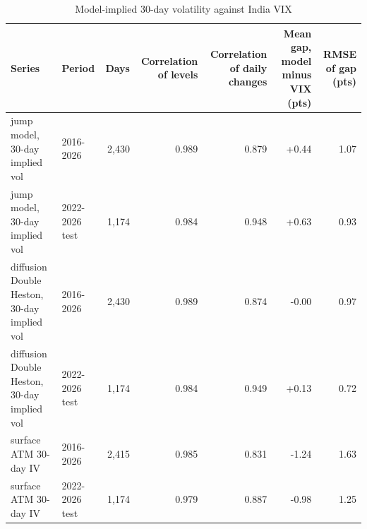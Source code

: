 \begin{table}[ht]
\centering
\small
\caption{Model-implied 30-day volatility against India VIX}
\begin{tabular}{llrrrrr}
\toprule
Series & Period & Days & Correlation of levels & Correlation of daily changes & Mean gap, model minus VIX (pts) & RMSE of gap (pts) \\
\midrule
jump model, 30-day implied vol & 2016-2026 & 2,430 & 0.989 & 0.879 & +0.44 & 1.07 \\
jump model, 30-day implied vol & 2022-2026 test & 1,174 & 0.984 & 0.948 & +0.63 & 0.93 \\
diffusion Double Heston, 30-day implied vol & 2016-2026 & 2,430 & 0.989 & 0.874 & -0.00 & 0.97 \\
diffusion Double Heston, 30-day implied vol & 2022-2026 test & 1,174 & 0.984 & 0.949 & +0.13 & 0.72 \\
surface ATM 30-day IV & 2016-2026 & 2,415 & 0.985 & 0.831 & -1.24 & 1.63 \\
surface ATM 30-day IV & 2022-2026 test & 1,174 & 0.979 & 0.887 & -0.98 & 1.25 \\
\bottomrule
\end{tabular}
\end{table}
